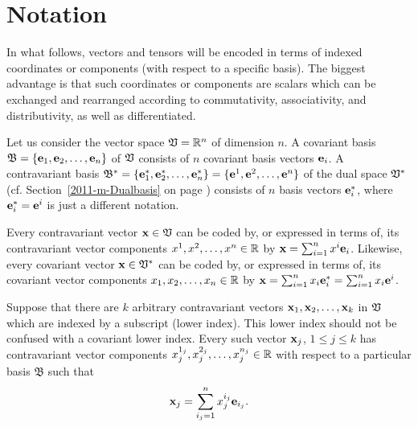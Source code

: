 \section{Notation}

In what follows, vectors and tensors will be encoded in terms of indexed coordinates or components
(with respect to a specific basis).
The biggest advantage is that such coordinates or components are scalars which can be
exchanged and rearranged according to commutativity, associativity, and distributivity,
as well as differentiated.

Let us consider
the vector space ${\frak V} = {\Bbb R}^n$ of dimension $n$.
A covariant basis
${\mathfrak B}=\{{\bf e}_1,{\bf e}_2,\ldots ,{\bf e}_n\}$ of ${\frak V}$
consists of
$n$ covariant basis vectors ${\bf e}_i$.
A contravariant basis
${\mathfrak B}^\ast =\{{\bf e}_1^\ast,{\bf e}_2^\ast,\ldots ,{\bf e}_n^\ast\}
= \{{\bf e}^1,{\bf e}^2,\ldots ,{\bf e}^n\}$ of the dual space ${\frak V}^\ast$
(cf. Section~\ref{2011-m-Dualbasis} on page \pageref{2011-m-Dualbasis})
consists of
$n$ basis vectors ${\bf e}_i^\ast$, where ${\bf e}_i^\ast = {\bf e}^i$ is just a different notation.

Every contravariant vector ${\bf x} \in {\frak V}$ can be coded by,  or expressed in terms of, its contravariant vector components
$x^1, x^2, \ldots , x^n \in {\Bbb R}$
by
${\bf x} =\sum_{i=1}^n x^{i} {\bf e}_{i}$.
Likewise, every covariant vector ${\bf x} \in {\frak V}^\ast$ can be coded by, or expressed in terms of, its covariant vector components
$x_1, x_2, \ldots , x_n \in {\Bbb R}$
by
${\bf x} =\sum_{i=1}^n x_{i} {\bf e}_{i}^\ast =\sum_{i=1}^n x_{i} {\bf e}^{i}$.

Suppose that there are $k$ arbitrary contravariant vectors ${\bf x}_1,{\bf x}_2,\ldots ,{\bf x}_k$ in ${\frak V}$ which are indexed by a subscript
(lower index). This lower index should not be confused with a covariant lower index.
Every such vector ${\bf x}_j$, $1 \le j \le k$ has contravariant vector components
$x^{1_j}_j, x^{2_j}_j, \ldots , x^{n_j}_j \in {\Bbb R}$
with respect to a particular basis ${\mathfrak B}$
such that
\begin{equation}
{\bf x}_j =\sum_{{i_j}=1}^n x^{i_j}_j{\bf e}_{{i_j}}.
\label{2016-m-tensor-contrvvs}
\end{equation}

